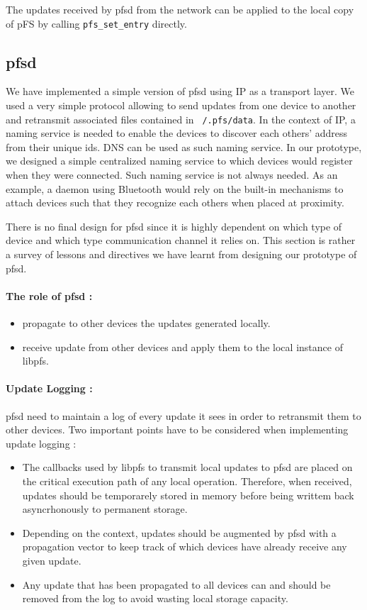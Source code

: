 The updates received by pfsd from the network can be applied to the
local copy of pFS by calling {\tt pfs\_set\_entry} directly.

\subsection {pfsd}

We have implemented a simple version of pfsd using IP as a transport
layer. We used a very simple protocol allowing to send updates from
one device to another and retransmit associated files contained in {\tt
  /.pfs/data}. In the context of IP, a naming service is needed to
enable the devices to discover each others' address from
their unique ids. DNS can be used as such naming service. In our
prototype, we designed a simple centralized naming service to which
devices would register when they were connected. Such naming service
is not always needed. As an example, a daemon using Bluetooth
would rely on the built-in mechanisms to attach devices such that they
recognize each others when placed at proximity.

There is no final design for pfsd since it is highly dependent on which
type of device and which type communication channel it relies on. This
section is rather a survey of lessons and directives we have learnt
from designing our prototype of pfsd. 

\paragraph {The role of pfsd :}
\begin{itemize}
\item propagate to other devices the updates generated locally.
\item receive update from other devices and apply them to the local
  instance of libpfs.
\end{itemize}

\paragraph {Update Logging :}
pfsd need to maintain a log of every update it sees in order to
retransmit them to other devices. Two important points have to be
considered when implementing update logging :
\begin{itemize}
\item The callbacks used by libpfs to transmit local updates to pfsd are
  placed on the critical execution path of any local
  operation. Therefore, when received, updates should be temporarely
  stored in memory before being writtem back asyncrhonously to permanent
  storage.
\item Depending on the context, updates should be augmented by pfsd
  with a propagation vector to keep track of which devices have
  already receive any given update.
\item Any update that has been propagated to all devices can and
  should be removed from the log to avoid wasting local storage
  capacity.
\end{itemize}

